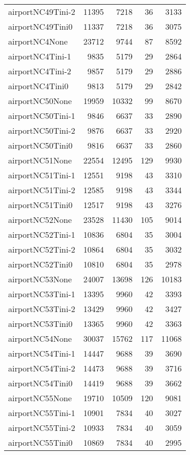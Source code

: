 \begin{longtable}{lrrrr}
airportNC49Tini-2 & 11395 & 7218 & 36 & 3133 \\
airportNC49Tini0 & 11337 & 7218 & 36 & 3075 \\
airportNC4None & 23712 & 9744 & 87 & 8592 \\
airportNC4Tini-1 & 9835 & 5179 & 29 & 2864 \\
airportNC4Tini-2 & 9857 & 5179 & 29 & 2886 \\
airportNC4Tini0 & 9813 & 5179 & 29 & 2842 \\
airportNC50None & 19959 & 10332 & 99 & 8670 \\
airportNC50Tini-1 & 9846 & 6637 & 33 & 2890 \\
airportNC50Tini-2 & 9876 & 6637 & 33 & 2920 \\
airportNC50Tini0 & 9816 & 6637 & 33 & 2860 \\
airportNC51None & 22554 & 12495 & 129 & 9930 \\
airportNC51Tini-1 & 12551 & 9198 & 43 & 3310 \\
airportNC51Tini-2 & 12585 & 9198 & 43 & 3344 \\
airportNC51Tini0 & 12517 & 9198 & 43 & 3276 \\
airportNC52None & 23528 & 11430 & 105 & 9014 \\
airportNC52Tini-1 & 10836 & 6804 & 35 & 3004 \\
airportNC52Tini-2 & 10864 & 6804 & 35 & 3032 \\
airportNC52Tini0 & 10810 & 6804 & 35 & 2978 \\
airportNC53None & 24007 & 13698 & 126 & 10183 \\
airportNC53Tini-1 & 13395 & 9960 & 42 & 3393 \\
airportNC53Tini-2 & 13429 & 9960 & 42 & 3427 \\
airportNC53Tini0 & 13365 & 9960 & 42 & 3363 \\
airportNC54None & 30037 & 15762 & 117 & 11068 \\
airportNC54Tini-1 & 14447 & 9688 & 39 & 3690 \\
airportNC54Tini-2 & 14473 & 9688 & 39 & 3716 \\
airportNC54Tini0 & 14419 & 9688 & 39 & 3662 \\
airportNC55None & 19710 & 10509 & 120 & 9081 \\
airportNC55Tini-1 & 10901 & 7834 & 40 & 3027 \\
airportNC55Tini-2 & 10933 & 7834 & 40 & 3059 \\
airportNC55Tini0 & 10869 & 7834 & 40 & 2995 \\

\end{longtable}
